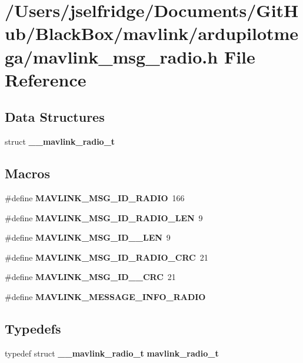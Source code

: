 \section{/\+Users/jselfridge/\+Documents/\+Git\+Hub/\+Black\+Box/mavlink/ardupilotmega/mavlink\+\_\+msg\+\_\+radio.h File Reference}
\label{mavlink__msg__radio_8h}
\subsection*{Data Structures}
\begin{DoxyCompactItemize}
\item 
struct \textbf{ \+\_\+\+\_\+mavlink\+\_\+radio\+\_\+t}
\end{DoxyCompactItemize}
\subsection*{Macros}
\begin{DoxyCompactItemize}
\item 
\#define \textbf{ M\+A\+V\+L\+I\+N\+K\+\_\+\+M\+S\+G\+\_\+\+I\+D\+\_\+\+R\+A\+D\+IO}~166
\item 
\#define \textbf{ M\+A\+V\+L\+I\+N\+K\+\_\+\+M\+S\+G\+\_\+\+I\+D\+\_\+\+R\+A\+D\+I\+O\+\_\+\+L\+EN}~9
\item 
\#define \textbf{ M\+A\+V\+L\+I\+N\+K\+\_\+\+M\+S\+G\+\_\+\+I\+D\+\_\+\_\+\+L\+EN}~9
\item 
\#define \textbf{ M\+A\+V\+L\+I\+N\+K\+\_\+\+M\+S\+G\+\_\+\+I\+D\+\_\+\+R\+A\+D\+I\+O\+\_\+\+C\+RC}~21
\item 
\#define \textbf{ M\+A\+V\+L\+I\+N\+K\+\_\+\+M\+S\+G\+\_\+\+I\+D\+\_\+\_\+\+C\+RC}~21
\item 
\#define \textbf{ M\+A\+V\+L\+I\+N\+K\+\_\+\+M\+E\+S\+S\+A\+G\+E\+\_\+\+I\+N\+F\+O\+\_\+\+R\+A\+D\+IO}
\end{DoxyCompactItemize}
\subsection*{Typedefs}
\begin{DoxyCompactItemize}
\item 
typedef struct \textbf{ \+\_\+\+\_\+mavlink\+\_\+radio\+\_\+t} \textbf{ mavlink\+\_\+radio\+\_\+t}
\end{DoxyCompactItemize}


